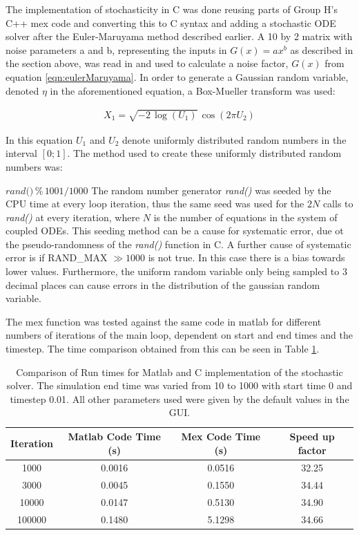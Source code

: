 \documentclass[a4paper, 12pt]{report}
\begin{document}
The implementation of stochasticity in C was done reusing parts of Group H's C++ mex code and converting this to C syntax and adding a stochastic ODE solver after the Euler-Maruyama method described earlier. A 10 by 2 matrix with noise parameters a and b, representing the inputs in $G(x) = ax^b$ as described in the section above, was read in and used to calculate a noise factor, $G(x)$ from equation \eqref{eqn:eulerMaruyama}. In order to generate a Gaussian random variable, denoted $\eta$ in the aforementioned equation, a Box-Mueller transform \cite{box1958} was used:

\begin{align}
\label{eqn:boxMueller}
X_1 = \sqrt{ -2\, \log(U_1)}\, \cos(2 \pi U_2) 
\end{align}

In this equation $U_1$ and $U_2$ denote uniformly distributed random numbers in the interval $[0;1]$. The method used to create these uniformly distributed random numbers was: 

$\textit{rand()}\,\%\, 1001 / 1000$ 
The random number generator \textit{rand()} was seeded by the CPU time at every loop iteration, thus the same seed was used for the $2N$ calls to \textit{rand()} at every iteration, where $N$ is the number of equations in the system of coupled ODEs. This seeding method can be a cause for systematic error, due ot the pseudo-randomness of the \textit{rand()} function in C. A further cause of systematic error is if RAND\_MAX $\gg 1000$ is not true. In this case there is a bias towards lower values. Furthermore, the uniform random variable only being sampled to 3 decimal places can cause errors in the distribution of the gaussian random variable.

The mex function was tested against the same code in matlab for different numbers of iterations of the main loop, dependent on start and end times and the timestep. The time comparison obtained from this can be seen in Table \ref{tbl:matlabCComparison}.

\begin{table}
\centering
\begin{tabular}{ | c | c | c | c | }
\hline
Iteration & Matlab Code Time (s) & Mex Code Time (s) & Speed up factor \\ \hline
1000 & 0.0016 & 0.0516 & 32.25 \\ \hline
3000 & 0.0045 & 0.1550 & 34.44 \\ \hline
10000 & 0.0147 & 0.5130 & 34.90 \\ \hline
100000 & 0.1480 & 5.1298 & 34.66 \\
\hline
\end{tabular}
\caption{Comparison of Run times for Matlab and C implementation of the stochastic solver. The simulation end time was varied from 10 to 1000 with start time 0 and timestep 0.01. All other parameters used were given by the default values in the GUI.}
\label{tbl:matlabCComparison}
\end{table}
\end{document}
